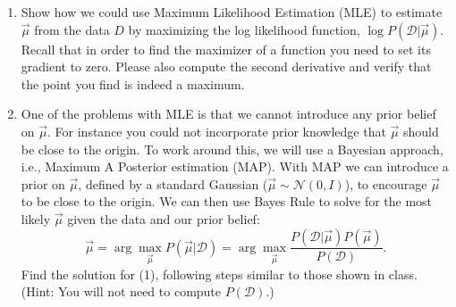 \documentclass[11pt]{article}
\begin{document}
\begin{enumerate}
	\item Show how we could use Maximum Likelihood Estimation (MLE) to estimate $\vec{\mu}$ from the data $D$ by maximizing the log likelihood function, $\log P(\mathcal{D} | \vec{\mu})$. Recall that in order to find the maximizer of a function you need to set its gradient to zero. Please also compute the second derivative and verify that the point you find is indeed a maximum.  
	
	\item One of the problems with MLE is that we cannot introduce any prior belief on $\vec{\mu}$. For instance you could not incorporate prior knowledge that  $\vec{\mu}$ should be close to the origin. To work around this, we will use a Bayesian approach, i.e., Maximum A Posterior estimation (MAP). 
With MAP we can introduce a prior on $\vec{\mu}$, defined by a standard Gaussian ($\vec{\mu} \sim \mathcal{N}(0, I)$), to encourage $\vec{\mu}$ to be close to the origin. 
We can then use Bayes Rule to solve for the most likely $\vec{\mu}$ given the data and our prior belief:
\begin{equation}
	\vec{\mu}=\arg\max_{\vec{\mu}} P(\vec{\mu} | \mathcal{D})=\arg\max_{\vec{\mu}} \frac{P(\mathcal{D} | \vec{\mu})P(\vec{\mu})}{P(\mathcal{D})}.\label{part2}
\end{equation}
Find the solution for (1), following steps similar to those shown in class. (Hint: You will not need to compute $P(\mathcal{D})$.)
	

\end{enumerate}
\end{document}
